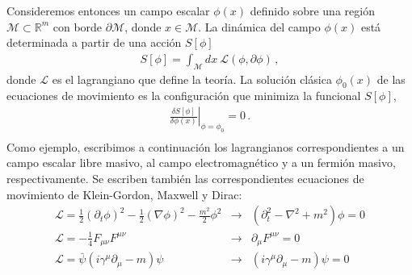 Consideremos entonces un campo escalar $\phi(x)$ definido sobre una región $\mathcal{M}\subset \mathbb{R}^m$ con borde $\partial \mathcal{M}$, donde $x \in  \mathcal{M}$. La dinámica del campo $\phi(x)$ está determinada a partir de una acción $S[\phi]$
\begin{align}
		S[\phi]=\int_\mathcal{M} dx\ \mathscr L(\phi,\partial\phi)\,,
\end{align}
 donde $\mathscr L$ es el lagrangiano que define la teoría. La solución clásica $\phi _0(x)$ de las ecuaciones de movimiento es la configuración que minimiza la funcional $S[\phi]$,
\begin{equation}
\begin{array}{c}
\left. \frac{\delta S [ \phi ] }{\delta \phi (x)}  \right| _{\phi = \phi _0  } = 0 \, . \\[10pt]
\end{array}
\end{equation}
Como ejemplo, escribimos a continuación los lagrangianos correspondientes a un campo escalar libre masivo, al campo electromagnético y a un fermión masivo, respectivamente. Se escriben también las correspondientes ecuaciones de movimiento de Klein-Gordon, Maxwell y Dirac:
\begin{equation}
\begin{array}{lcl}
\mathscr{L} = \frac{1}{2} (\partial _t \phi ) ^2 - \frac{1}{2} (  \nabla \phi ) ^2 - 
	\frac{m^2}{2} \phi ^2 
&\rightarrow& 
\left(
	\partial _t ^2 - \nabla ^2 + m^2 
		\right) \phi = 0 \\[8pt]
		
\mathscr{L} = - \frac{1}{4} F _{\mu \nu} F ^{\mu \nu}
&\rightarrow&
 \partial _{\mu} F ^{\mu \nu} = 0 \\[8pt]

\mathscr{L} =  { \bar{\psi} } \left(
			i \gamma ^{\mu} \partial _{\mu} - m 
			\right) \psi 
&\rightarrow&
			\left( i  \gamma ^{\mu} \partial _{\mu}  - m \right)\psi = 0\\[10pt]
\end{array}
\label{campos}
\end{equation}

